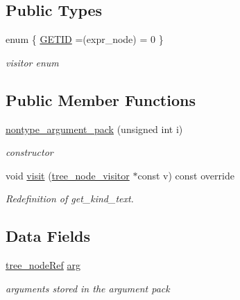 \subsection*{Public Types}
\begin{DoxyCompactItemize}
\item 
enum \{ \hyperlink{structnontype__argument__pack_a5ef010ae300be1cdc75b14c02bbfb02aac9b3fafc9571a18505283c8c44a4de28}{G\+E\+T\+ID} =(expr\+\_\+node) = 0
 \}\begin{DoxyCompactList}\small\item\em visitor enum \end{DoxyCompactList}
\end{DoxyCompactItemize}
\subsection*{Public Member Functions}
\begin{DoxyCompactItemize}
\item 
\hyperlink{structnontype__argument__pack_a37f435a7d04e821fd0532edfea38e6c9}{nontype\+\_\+argument\+\_\+pack} (unsigned int i)
\begin{DoxyCompactList}\small\item\em constructor \end{DoxyCompactList}\item 
void \hyperlink{structnontype__argument__pack_a254f0396e0ad2b47a793f8cb7f5b233a}{visit} (\hyperlink{classtree__node__visitor}{tree\+\_\+node\+\_\+visitor} $\ast$const v) const override
\begin{DoxyCompactList}\small\item\em Redefinition of get\+\_\+kind\+\_\+text. \end{DoxyCompactList}\end{DoxyCompactItemize}
\subsection*{Data Fields}
\begin{DoxyCompactItemize}
\item 
\hyperlink{tree__node_8hpp_a6ee377554d1c4871ad66a337eaa67fd5}{tree\+\_\+node\+Ref} \hyperlink{structnontype__argument__pack_a9db42edf6a44f8dd2ecc8fde8954aae3}{arg}
\begin{DoxyCompactList}\small\item\em arguments stored in the argument pack \end{DoxyCompactList}\end{DoxyCompactItemize}
